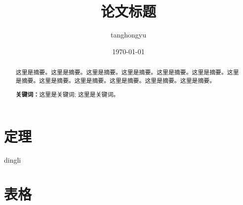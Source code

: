 \documentclass[12pt, a4paper, oneside]{ctexart}
\title{\textbf{论文标题}}
\author{tanghongyu}
\date{\today}
\newtheorem{theorem}{定理}[section]
\begin{document}
\maketitle

\setcounter{page}{0}
\maketitle
\thispagestyle{empty}
\newpage
\begin{abstract}
    这里是摘要。这里是摘要。这里是摘要。这里是摘要。这里是摘要。这里是摘要。这里是摘要。这里是摘要。这里是摘要。这里是摘要。这里是摘要。这里是摘要。
    \par\textbf{关键词：}这里是关键词; 这里是关键词。
\end{abstract}

\newpage
{}
\setcounter{page}{1}
\tableofcontents
\newpage
\setcounter{page}{1}

\section{定理}

dingli\cite{elgamal1985public}
\newpage




\section{表格}





 

 
\end{document}
